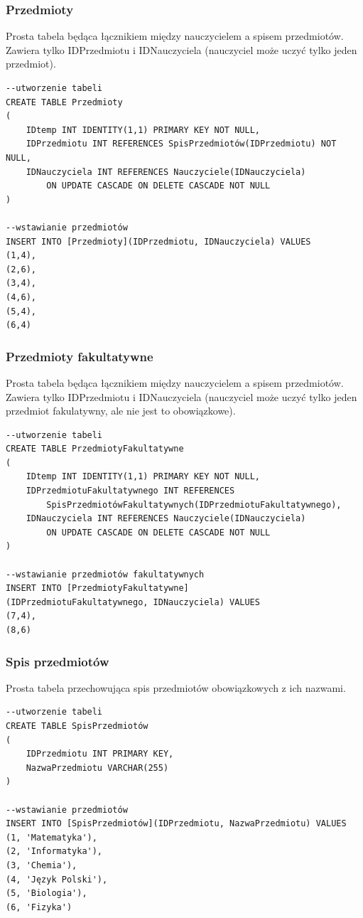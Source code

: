 \documentclass[60pt]{article}
\begin{document}
\subsubsection{Przedmioty}
 Prosta tabela będąca łącznikiem między nauczycielem a spisem przedmiotów. Zawiera tylko IDPrzedmiotu i IDNauczyciela (nauczyciel może uczyć tylko jeden przedmiot).
 
 \begin{verbatim}
--utworzenie tabeli
CREATE TABLE Przedmioty
(
    IDtemp INT IDENTITY(1,1) PRIMARY KEY NOT NULL,
    IDPrzedmiotu INT REFERENCES SpisPrzedmiotów(IDPrzedmiotu) NOT NULL,
    IDNauczyciela INT REFERENCES Nauczyciele(IDNauczyciela)
        ON UPDATE CASCADE ON DELETE CASCADE NOT NULL
)

--wstawianie przedmiotów
INSERT INTO [Przedmioty](IDPrzedmiotu, IDNauczyciela) VALUES
(1,4),
(2,6),
(3,4),
(4,6),
(5,4),
(6,4)
\end{verbatim}

\subsubsection{Przedmioty fakultatywne}
 Prosta tabela będąca łącznikiem między nauczycielem a spisem przedmiotów. Zawiera tylko IDPrzedmiotu i IDNauczyciela (nauczyciel może uczyć tylko jeden przedmiot fakulatywny, ale nie jest to obowiązkowe).
 
 \begin{verbatim}
--utworzenie tabeli
CREATE TABLE PrzedmiotyFakultatywne
(
    IDtemp INT IDENTITY(1,1) PRIMARY KEY NOT NULL,
    IDPrzedmiotuFakultatywnego INT REFERENCES
        SpisPrzedmiotówFakultatywnych(IDPrzedmiotuFakultatywnego),
    IDNauczyciela INT REFERENCES Nauczyciele(IDNauczyciela)
        ON UPDATE CASCADE ON DELETE CASCADE NOT NULL
)

--wstawianie przedmiotów fakultatywnych
INSERT INTO [PrzedmiotyFakultatywne]
(IDPrzedmiotuFakultatywnego, IDNauczyciela) VALUES
(7,4),
(8,6)
\end{verbatim}

\subsubsection{Spis przedmiotów}
Prosta tabela przechowująca spis przedmiotów obowiązkowych z ich nazwami.

 \begin{verbatim}
--utworzenie tabeli
CREATE TABLE SpisPrzedmiotów
(
    IDPrzedmiotu INT PRIMARY KEY,
    NazwaPrzedmiotu VARCHAR(255)
)

--wstawianie przedmiotów
INSERT INTO [SpisPrzedmiotów](IDPrzedmiotu, NazwaPrzedmiotu) VALUES
(1, 'Matematyka'),
(2, 'Informatyka'),
(3, 'Chemia'),
(4, 'Język Polski'),
(5, 'Biologia'),
(6, 'Fizyka')
\end{verbatim}
\end{document}
